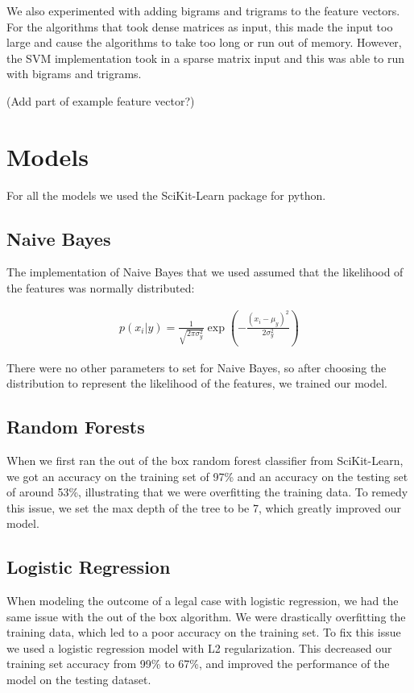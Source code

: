 \documentclass[journal]{IEEEtran}
\begin{document}
We also experimented with adding bigrams and trigrams to the feature vectors. For the algorithms that took dense matrices as input, this made the input too large and cause the algorithms to take too long or run out of memory. However, the SVM implementation took in a sparse matrix input and this was able to run with bigrams and trigrams.

(Add part of example feature vector?)

\section{Models}

For all the models we used the SciKit-Learn package \cite{scikit-learn} for python.

\subsection{Naive Bayes}

The implementation of Naive Bayes that we used assumed that the likelihood of the features was normally distributed:

\begin{equation}
\begin{aligned}
p(x_i | y) = \frac{1}{\sqrt{2 \pi \sigma_y^2}} \exp \left ( - \frac{(x_i - \mu_y)^2}{2\sigma_y^2}\right)
\end{aligned}
\end{equation}

There were no other parameters to set for Naive Bayes, so after choosing the distribution to represent the likelihood of the features, we trained our model.

\subsection{Random Forests}

When we first ran the out of the box random forest classifier from SciKit-Learn, we got an accuracy on the training set of 97\% and an accuracy on the testing set of around 53\%, illustrating that we were overfitting the training data. To remedy this issue, we set the max depth of the tree to be 7, which greatly improved our model. 

\subsection{Logistic Regression}

When modeling the outcome of a legal case with logistic regression, we had the same issue with the out of the box algorithm. We were drastically overfitting the training data, which led to a poor accuracy on the training set. To fix this issue we used a logistic regression model with L2 regularization. This decreased our training set accuracy from 99\% to 67\%, and improved the performance of the model on the testing dataset. 
\end{document}
